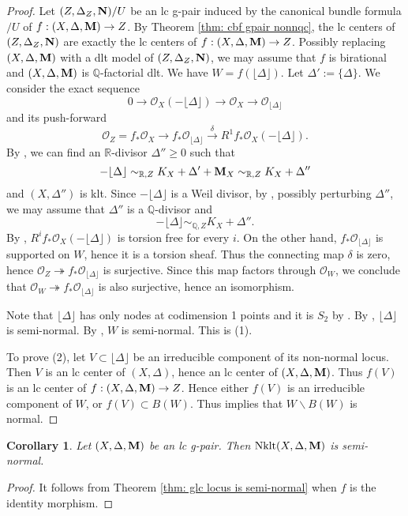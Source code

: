 \documentclass[11pt]{amsart}
\numberwithin{equation}{section}
\newcommand{\Mm}{{\bf{M}}}
\newcommand{\NN}{{\bf{N}}}
\newcommand{\Qq}{\mathbb{Q}}
\newcommand{\Rr}{\mathbb{R}}
\newcommand{\Nklt}{\operatorname{Nklt}}
\newcommand{\lf}{\lfloor}
\newcommand{\rf}{\rfloor}
\newcommand{\Oo}{\mathcal{O}}
\newtheorem{cor}[thm]{Corollary}
\theoremstyle{definition}
\theoremstyle{definition}
\theoremstyle{definition}
\begin{document}
\begin{proof}
Let $(Z,\Delta_Z,\NN)/U$ be an lc g-pair induced by the canonical bundle formula$/U$ of $f: (X,\Delta,\Mm)\rightarrow Z$. By Theorem \ref{thm: cbf gpair nonnqc}, the lc centers of $(Z,\Delta_Z,\NN)$ are exactly the lc centers of $f: (X,\Delta,\Mm)\rightarrow Z$. Possibly replacing $(X,\Delta,\Mm)$ with a dlt model of $(Z,\Delta_Z,\NN)$, we may assume that $f$ is birational and $(X,\Delta,\Mm)$ is $\mathbb Q$-factorial dlt. We have $W=f(\lf\Delta\rf)$. Let $\Delta':=\{\Delta\}$. We consider the exact sequence 
$$
0\to\Oo_X(-\lf\Delta\rf)\to\Oo_X\to\Oo_{\lf\Delta\rf}
$$
and its push-forward
$$
\Oo_Z=f_*\Oo_X\to f_*\Oo_{\lf\Delta\rf}\stackrel{\delta}{\longrightarrow}R^1f_*\Oo_X(-\lf\Delta\rf).
$$
By \cite[Lemma 3.4]{HL22}, we can find an $\Rr$-divisor $\Delta''\ge 0$ such that $$-\lf\Delta\rf\sim_{\Rr,Z}K_X+\Delta'+\Mm_X\sim_{\Rr,Z}K_X+\Delta''$$ and $(X,\Delta'')$ is klt. Since $-\lfloor\Delta\rfloor$ is a Weil divisor, by \cite[Lemma 5.3, Theorem 5.6]{HLS19}, possibly perturbing $\Delta''$, we may assume that $\Delta''$ is a $\Qq$-divisor and 
$$-\lf\Delta\rf\sim_{\mathbb Q,Z}K_X+\Delta''.$$
By \cite[Corollary 10.40]{Kol13}, $R^if_*\Oo_{X}(-\lf\Delta\rf)$ is torsion free for every $i$. On the other hand, $f_*\Oo_{\lf\Delta\rf}$ is supported on $W$, hence it is a torsion sheaf. Thus the connecting map $\delta$ is zero, hence $\Oo_Z\twoheadrightarrow f_*\Oo_{\lf\Delta\rf}$ is surjective. Since this map factors through $\Oo_W$, we conclude that $\Oo_W\twoheadrightarrow f_*\Oo_{\lf\Delta\rf}$ is also surjective, hence an isomorphism.



Note that $\lf\Delta\rf$ has only nodes at codimension 1 points and it is $S_2$ by \cite[Corollary 2.88]{Kol13}. By \cite[Lemma 10.14]{Kol13}, $\lf\Delta\rf$ is semi-normal. By \cite[Lemma 10.15]{Kol13}, $W$ is semi-normal. This is (1).

To prove (2), let $V\subset\lf\Delta\rf$ be an irreducible component of its non-normal locus. Then $V$ is an lc center of $(X,\Delta)$, hence an lc center of $(X,\Delta,\Mm)$. Thus $f(V)$ is an lc center of $f: (X,\Delta,\Mm)\rightarrow Z$. Hence either $f(V)$ is an irreducible component of $W$, or $f(V)\subset B(W)$. Thus \cite[Complement 10.15.1]{Kol13} implies that $W \backslash B(W)$ is normal.
\end{proof}

\begin{cor}
Let $(X,\Delta,\Mm)$ be an lc g-pair. Then $\Nklt(X,\Delta,\Mm)$ is semi-normal.
\end{cor}
\begin{proof}
It follows from Theorem \ref{thm: glc locus is semi-normal} when $f$ is the identity morphism.
\end{proof}
\end{document}
